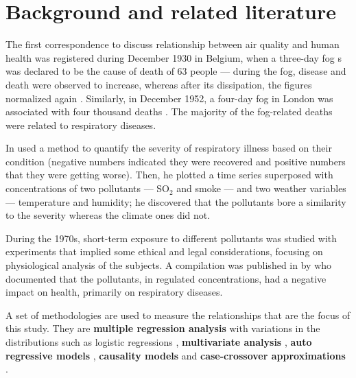 \documentclass[
  11pt,
  a4paper,
  oneside
]{article}
\begin{document}
\section{Background and related literature}
The first correspondence to discuss relationship between air quality and human health was registered during December 1930 in Belgium, when a three-day fog s was declared to be the cause of death of 63 people --- during the fog, disease and death were observed to increase, whereas after its dissipation, the  figures normalized again \citep{firket1936}. Similarly, in December 1952, a four-day fog in London was associated with four thousand deaths \citep{logan1953}. The majority of the fog-related deaths were related to respiratory diseases.

In \citeyear{Lawther1959} \citeauthor{Lawther1959} \citep{Lawther1959} used a method to quantify the severity of respiratory illness based on their condition (negative numbers indicated they were recovered and positive numbers that they were getting worse). Then, he plotted a time series superposed with concentrations of two pollutants --- SO$_2$ and smoke --- and two weather variables --- temperature and humidity; he discovered that the pollutants bore a similarity to the severity whereas the climate ones did not.

During the 1970s, short-term exposure to different pollutants was studied \citep{HackneyEA1975, EhrlichEA1977, HackneyEA1978, LinnEA1978} with experiments that implied some ethical and legal considerations,  focusing on physiological analysis of the subjects. A compilation was published in by \citeauthor{Ferris1978} \citep{Ferris1978} who documented that the pollutants, in regulated concentrations, had a negative impact on health, primarily on respiratory diseases.

A set of methodologies are used to measure the relationships that are the focus of this study. They are \textbf{multiple regression analysis} \citep{Hyndman2018, Lebowitz1973, hasselblad1978, hatzakisEA1986} with variations in the distributions such as logistic regressions \citep{Korn1979}, \textbf{multivariate analysis} \citep{LaveEA1973, gottinger1983}, \textbf{auto regressive models} \citep{WeiEA1991}, \textbf{causality models} \citep{popescuEA2013} and \textbf{case-crossover approximations} \citep{Maclure1991, carracedoMartinezEA2009}.
\end{document}
